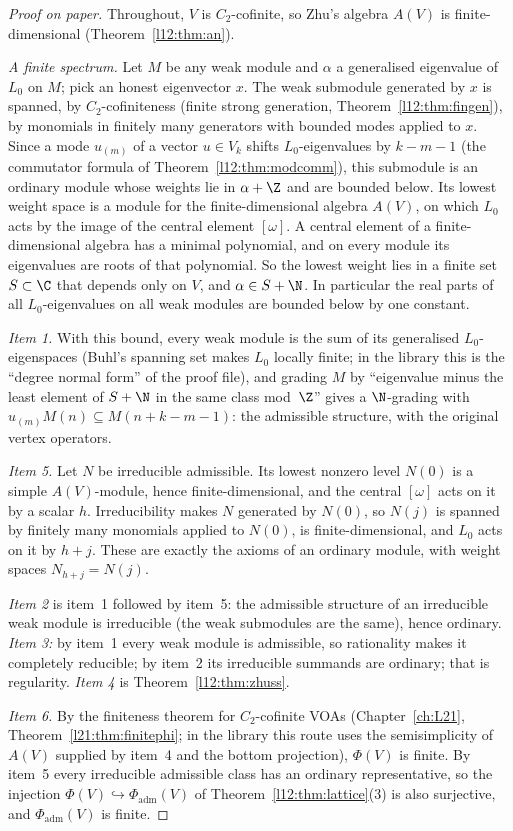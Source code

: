 \begin{proof}[Proof on paper]
Throughout, $V$ is $C_2$-cofinite, so Zhu's algebra $A(V)$ is finite-dimensional (Theorem~\ref{l12:thm:an}).

\emph{A finite spectrum.} Let $M$ be any weak module and $\alpha$ a generalised eigenvalue of $L_0$ on $M$; pick an honest
eigenvector $x$. The weak submodule generated by $x$ is spanned, by $C_2$-cofiniteness (finite strong generation,
Theorem~\ref{l12:thm:fingen}), by monomials in finitely many generators with bounded modes applied to $x$. Since a mode
$u_{(m)}$ of a vector $u\in V_k$ shifts $L_0$-eigenvalues by $k-m-1$ (the commutator formula of
Theorem~\ref{l12:thm:modcomm}), this submodule is an ordinary module whose weights lie in $\alpha+\Z$ and are bounded
below. Its lowest weight space is a module for the finite-dimensional algebra $A(V)$, on which $L_0$ acts by the image of
the central element $[\omega]$. A central element of a finite-dimensional algebra has a minimal polynomial, and on every
module its eigenvalues are roots of that polynomial. So the lowest weight lies in a finite set $S\subset\C$ that depends
only on $V$, and $\alpha\in S+\N$. In particular the real parts of all $L_0$-eigenvalues on all weak modules are bounded
below by one constant.

\emph{Item 1.} With this bound, every weak module is the sum of its generalised $L_0$-eigenspaces (Buhl's spanning set makes
$L_0$ locally finite; in the library this is the ``degree normal form'' of the proof file), and grading $M$ by ``eigenvalue minus the least element of $S+\N$ in the same class mod~$\Z$'' gives a
$\N$-grading with $u_{(m)}M(n)\subseteq M(n+k-m-1)$: the admissible structure, with the original vertex operators.

\emph{Item 5.} Let $N$ be irreducible admissible. Its lowest nonzero level $N(0)$ is a simple $A(V)$-module, hence
finite-dimensional, and the central $[\omega]$ acts on it by a scalar $h$. Irreducibility makes $N$ generated by $N(0)$, so
$N(j)$ is spanned by finitely many monomials applied to $N(0)$, is finite-dimensional, and $L_0$ acts on it by $h+j$. These
are exactly the axioms of an ordinary module, with weight spaces $N_{h+j}=N(j)$.

\emph{Item 2} is item~1 followed by item~5: the admissible structure of an irreducible weak module is irreducible (the weak
submodules are the same), hence ordinary. \emph{Item 3:} by item~1 every weak module is admissible, so rationality makes it
completely reducible; by item~2 its irreducible summands are ordinary; that is regularity. \emph{Item 4} is
Theorem~\ref{l12:thm:zhuss}.

\emph{Item 6.} By the finiteness theorem for $C_2$-cofinite VOAs (Chapter~\ref{ch:L21}, Theorem~\ref{l21:thm:finitephi}; in the
library this route uses the semisimplicity of $A(V)$ supplied by item~4 and the bottom projection), $\Phi(V)$ is finite. By
item~5 every irreducible admissible class has an ordinary representative, so the injection $\Phi(V)\hookrightarrow\Phi_{\mathrm{adm}}(V)$
of Theorem~\ref{l12:thm:lattice}(3) is also surjective, and $\Phi_{\mathrm{adm}}(V)$ is finite.
\end{proof}

